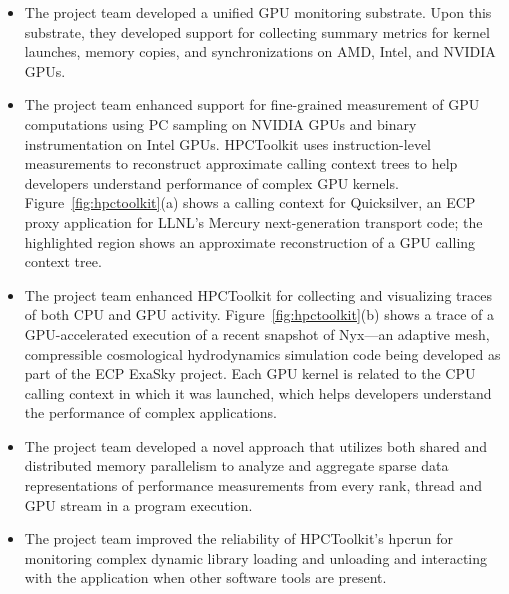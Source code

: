 \begin{itemize}

\item
The project team developed a unified GPU monitoring substrate. Upon this substrate, they developed support for collecting summary metrics for 
kernel launches, memory copies, and synchronizations on AMD, Intel, and NVIDIA GPUs.


\item
The project team enhanced support for fine-grained measurement of GPU computations using PC sampling on NVIDIA GPUs and binary instrumentation on Intel GPUs. 
HPCToolkit uses instruction-level measurements to reconstruct approximate calling context trees to help developers understand performance of complex GPU kernels.
Figure~\ref{fig:hpctoolkit}(a) shows a calling context for Quicksilver, an ECP proxy application for LLNL's Mercury next-generation transport code; the highlighted region shows an approximate reconstruction of a GPU calling context tree.

\item
The project team enhanced HPCToolkit for collecting and visualizing traces of both CPU and GPU activity.
Figure~\ref{fig:hpctoolkit}(b) shows a trace of a GPU-accelerated execution of a recent snapshot of Nyx---an adaptive mesh, compressible cosmological hydrodynamics simulation code being developed as part of the ECP ExaSky project. Each GPU kernel is related to the CPU calling context in which it was launched, which helps developers understand the performance of complex applications.

\item
The project team developed a novel approach that utilizes both shared and distributed memory parallelism to analyze and aggregate sparse data representations of performance measurements from every rank, thread and GPU stream in a program execution. 

\item 
The project team improved the reliability of HPCToolkit's hpcrun for monitoring complex dynamic library loading and unloading and interacting with the application when other software tools are present.

\end{itemize}

